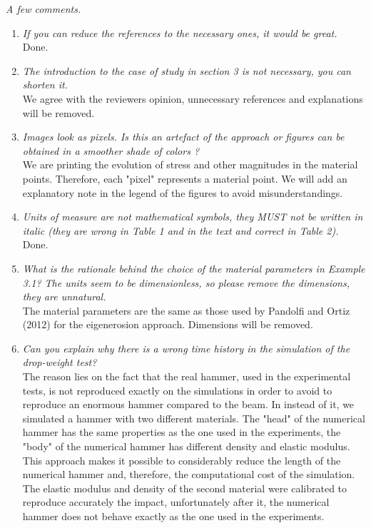 \documentclass[12pt]{article}
\begin{document}
\textit{A few comments.}
 \begin{enumerate}
 
\item \textit{If you can reduce the references to the necessary ones, it would be great.}\\

Done.

\item \textit{The introduction to the case of study in section 3 is not necessary, you can shorten it.}\\

We agree with the reviewer\textquotesingle s opinion, unnecessary references  and explanations will be removed. 

\item \textit{Images look as pixels. Is this an artefact of the approach or figures can be obtained in a smoother shade of colors ?}\\

We are printing the evolution of stress and other magnitudes in the material points. Therefore, each "pixel" represents a material point. We will add an explanatory note in the legend of the figures to avoid misunderstandings.

\item \textit{Units of measure are not mathematical symbols, they MUST not be written in italic (they are wrong in Table 1 and in the text and correct in Table 2).}\\

Done.

\item \textit{What is the rationale behind the choice of the material parameters in Example 3.1? The units seem to be dimensionless, so please remove the dimensions, they are unnatural.}\\

The material parameters are the same as those used by Pandolfi and Ortiz (2012) \cite{Ortiz_Pandolfi_2012} for the eigenerosion approach. Dimensions will be removed.

\item \textit{Can you explain why there is a wrong time history in the simulation of the drop-weight test?
}\\

The reason lies on the fact that the real hammer, used in the experimental tests, is not reproduced exactly on the simulations in order to avoid to reproduce an enormous hammer compared to the beam. In instead of it, we simulated a hammer with two different materials. The "head" of the numerical hammer has the same properties as the one used in the experiments, the "body" of the numerical hammer has different density and elastic modulus. This approach makes it possible to considerably reduce the length of the numerical hammer and, therefore, the computational cost of the simulation. The elastic modulus and density of the second material were calibrated to reproduce accurately the impact, unfortunately after it, the numerical hammer does not behave exactly as the one used in the experiments. 

\end{enumerate}
\end{document}
